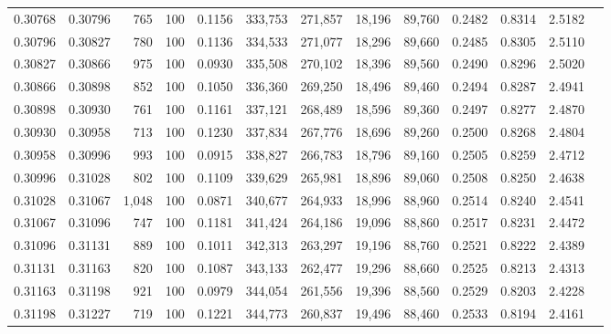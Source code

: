 \begin{tabular}{rrrrrrrrrrrrr}
0.30768 & 0.30796 &    765 & 100 &                                     0.1156 & 333,753 & 271,857 &  18,196 &  89,760 & 0.2482 & 0.8314 & 2.5182 \\
0.30796 & 0.30827 &    780 & 100 &                                     0.1136 & 334,533 & 271,077 &  18,296 &  89,660 & 0.2485 & 0.8305 & 2.5110 \\
0.30827 & 0.30866 &    975 & 100 &                                     0.0930 & 335,508 & 270,102 &  18,396 &  89,560 & 0.2490 & 0.8296 & 2.5020 \\
0.30866 & 0.30898 &    852 & 100 &                                     0.1050 & 336,360 & 269,250 &  18,496 &  89,460 & 0.2494 & 0.8287 & 2.4941 \\
0.30898 & 0.30930 &    761 & 100 &                                     0.1161 & 337,121 & 268,489 &  18,596 &  89,360 & 0.2497 & 0.8277 & 2.4870 \\
0.30930 & 0.30958 &    713 & 100 &                                     0.1230 & 337,834 & 267,776 &  18,696 &  89,260 & 0.2500 & 0.8268 & 2.4804 \\
0.30958 & 0.30996 &    993 & 100 &                                     0.0915 & 338,827 & 266,783 &  18,796 &  89,160 & 0.2505 & 0.8259 & 2.4712 \\
0.30996 & 0.31028 &    802 & 100 &                                     0.1109 & 339,629 & 265,981 &  18,896 &  89,060 & 0.2508 & 0.8250 & 2.4638 \\
0.31028 & 0.31067 &  1,048 & 100 &                                     0.0871 & 340,677 & 264,933 &  18,996 &  88,960 & 0.2514 & 0.8240 & 2.4541 \\
0.31067 & 0.31096 &    747 & 100 &                                     0.1181 & 341,424 & 264,186 &  19,096 &  88,860 & 0.2517 & 0.8231 & 2.4472 \\
0.31096 & 0.31131 &    889 & 100 &                                     0.1011 & 342,313 & 263,297 &  19,196 &  88,760 & 0.2521 & 0.8222 & 2.4389 \\
0.31131 & 0.31163 &    820 & 100 &                                     0.1087 & 343,133 & 262,477 &  19,296 &  88,660 & 0.2525 & 0.8213 & 2.4313 \\
0.31163 & 0.31198 &    921 & 100 &                                     0.0979 & 344,054 & 261,556 &  19,396 &  88,560 & 0.2529 & 0.8203 & 2.4228 \\
0.31198 & 0.31227 &    719 & 100 &                                     0.1221 & 344,773 & 260,837 &  19,496 &  88,460 & 0.2533 & 0.8194 & 2.4161 \\

\end{tabular}
